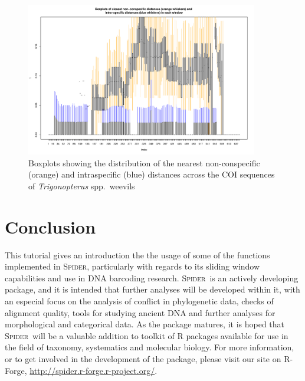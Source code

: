 \documentclass{article}
\newcommand{\spider}{\textsc{Spider}~} %
\newcommand{\Spider}{\textsc{Spider}} %
\newcommand{\progname}[1]{\textsc{#1}}
\begin{document}
\begin{figure}[p]
	\centering
	\includegraphics[width=0.9\textwidth]{weevilsBox}
	\caption{Boxplots showing the distribution of the nearest non-conspecific (orange) and intraspecific (blue) distances across the COI sequences of \emph{Trigonopterus} spp.\ weevils}
	\label{weevilsBox.fig}
\end{figure}


\section{Conclusion}
This tutorial gives an introduction the the usage of some of the functions implemented in \Spider, particularly with regards to its sliding window capabilities and use in DNA barcoding research. 
\spider is an actively developing package, and it is intended that further analyses will be developed within it, with an especial focus on the analysis of conflict in phylogenetic data, checks of alignment quality, tools for studying ancient DNA and further analyses for morphological and categorical data.
As the package matures, it is hoped that \spider will be a valuable addition to toolkit of \progname{R} packages available for use in the field of taxonomy, systematics and molecular biology. For more information, or to get involved in the development of the package, please visit our site on R-Forge, \href{http://spider.r-forge.r-project.org/}{http://spider.r-forge.r-project.org/}.




\end{document}
